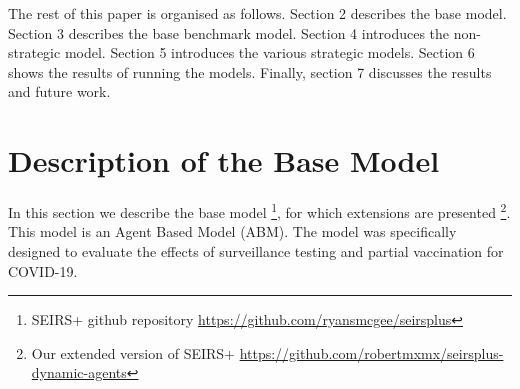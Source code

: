 \documentclass{article}
\begin{document}
The rest of this paper is organised as follows. Section 2 describes the base model. Section 3 describes the base benchmark model. Section 4 introduces the non-strategic model. Section 5 introduces the various strategic models. Section 6 shows the results of running the models. Finally, section 7 discusses the results and future work.



\newpage
\section{Description of the Base Model \label{description}}

In this section we describe the base model \footnote{SEIRS+ github repository {\url{https://github.com/ryansmcgee/seirsplus}}}, for which extensions are presented  \footnote{Our extended version of SEIRS+  {\url{https://github.com/robertmxmx/seirsplus-dynamic-agents}}}. 
This model is an Agent Based Model (ABM). 
The model was specifically designed to evaluate the effects of surveillance testing and partial vaccination for COVID-19.\newline
\end{document}
